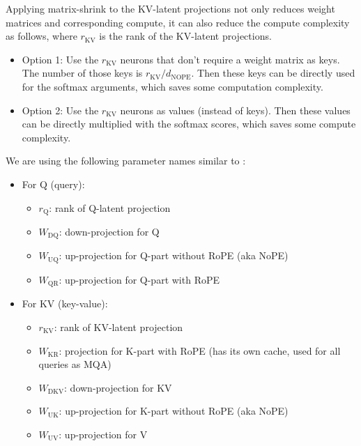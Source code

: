 \documentclass{article}
\newcommand{\WW}[1]{W_\text{#1}}                    %
\begin{document}
Applying matrix-shrink to the KV-latent projections not only reduces weight matrices and corresponding compute, it can also reduce the compute complexity as follows, where $r_\text{KV}$ is the rank of the KV-latent projections.
\begin{itemize}[topsep=-1pt, itemsep=-1pt]
  \item Option 1: Use the $r_\text{KV}$ neurons that don’t require a weight matrix as keys. The number of those keys is $r_\text{KV} / d_\text{NOPE}$. Then these keys can be directly used for the softmax arguments, which saves some computation complexity.
  \item Option 2: Use the $r_\text{KV}$ neurons as values (instead of keys). Then these values can be directly multiplied with the softmax scores, which saves some compute complexity.
\end{itemize}

We are using the following parameter names similar to \citep{deepseek-v2}:
\begin{itemize}[topsep=-1pt, itemsep=-1pt]
  \item For Q (query):
  \begin{itemize}[topsep=-1pt, itemsep=-1pt]
    \item $r_\text{Q}$: rank of Q-latent projection
    \item $\WW{DQ}$: down-projection for Q
    \item $\WW{UQ}$: up-projection for Q-part without RoPE (aka NoPE)
    \item $\WW{QR}$: up-projection for Q-part with RoPE
  \end{itemize}
  \item For KV (key-value):
  \begin{itemize}[topsep=-1pt, itemsep=-1pt]
    \item $r_\text{KV}$: rank of KV-latent projection
    \item $\WW{KR}$: projection for K-part with RoPE (has its own cache, used for all queries as MQA)
    \item $\WW{DKV}$: down-projection for KV
    \item $\WW{UK}$: up-projection for K-part without RoPE (aka NoPE)
    \item $\WW{UV}$: up-projection for V
  \end{itemize}
\end{itemize}

\def\dsRone     {\href{https://huggingface.co/deepseek-ai/DeepSeek-R1}         {DeepSeek-R1}}
\def\pplRone    {\href{https://huggingface.co/perplexity-ai/r1-1776}           {R1-1776}}
\def\dsVthree   {\href{https://huggingface.co/deepseek-ai/DeepSeek-V3}         {V3}}
\def\dsVtwoFive {\href{https://huggingface.co/deepseek-ai/DeepSeek-V2.5}       {DeepSeek-V2.5}}
\def\dsVtwoL    {\href{https://huggingface.co/deepseek-ai/DeepSeek-V2-Lite}    {DeepSeek-V2-lite}}
\def\dsVLtwoS   {\href{https://huggingface.co/deepseek-ai/deepseek-vl2-small}  {DeepSeek-VL2-small}}
\def\MiniCPM    {\href{https://huggingface.co/openbmb/MiniCPM3-4B}             {MiniCPM3-4B}}
\end{document}
